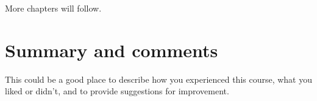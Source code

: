 \documentclass[english,11pt]{report}
\begin{document}
More chapters will follow.


\chapter{Summary and comments}

This could be a good place to describe how you experienced this course, what you liked or didn't, and to provide suggestions for improvement.



\MakeBibliography
\end{document}
